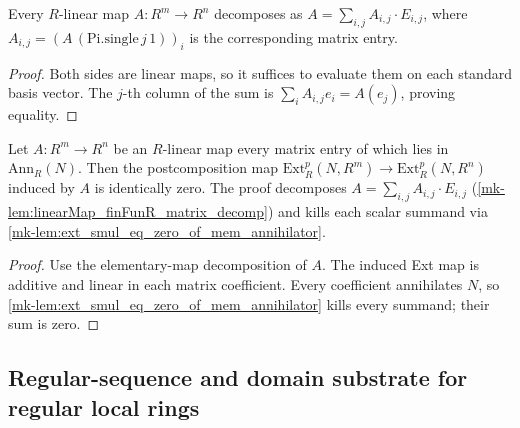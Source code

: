 \begin{lemma}\label{mk-lem:linearMap_finFunR_matrix_decomp}
  \leanok

  Every \(R\)-linear map \(A : R^m \to R^n\) decomposes as
  \(A = \sum_{i,j} A_{i,j} \cdot E_{i,j}\), where \(A_{i,j} = (A\,(\text{Pi.single}\,j\,1))_i\)
  is the corresponding matrix entry.
\end{lemma}
\begin{proof}
  \leanok

Both sides are linear maps, so it suffices to evaluate them on
  each standard basis vector. The \(j\)-th column of the sum is
  \(\sum_i A_{i,j}e_i=A(e_j)\), proving equality.
\end{proof}

\begin{lemma}\label{mk-lem:ext_comp_mk_zero_ofHom_eq_zero_of_entries_mem_annihilator}
  \leanok

  Let \(A : R^m \to R^n\) be an \(R\)-linear map every matrix entry of which lies in
  \(\text{Ann}_R(N)\). Then the postcomposition map
  \(\text{Ext}^p_R(N, R^m) \to \text{Ext}^p_R(N, R^n)\) induced by \(A\) is identically
  zero. The proof decomposes \(A = \sum_{i,j} A_{i,j} \cdot E_{i,j}\)
  (\ref{mk-lem:linearMap_finFunR_matrix_decomp}) and kills each scalar summand via
  \ref{mk-lem:ext_smul_eq_zero_of_mem_annihilator}.
\end{lemma}
\begin{proof}
  \leanok

Use the elementary-map decomposition of \(A\). The induced Ext map
  is additive and linear in each matrix coefficient. Every coefficient
  annihilates \(N\), so \ref{mk-lem:ext_smul_eq_zero_of_mem_annihilator}
  kills every summand; their sum is zero.
\end{proof}

\subsection{Regular-sequence and domain substrate for regular local rings}
\label{mk-subsec:ab_regular_domain_substrate}

